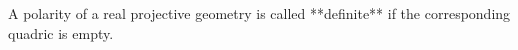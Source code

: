 A polarity of a real projective geometry is called **definite** if the corresponding quadric is empty.
